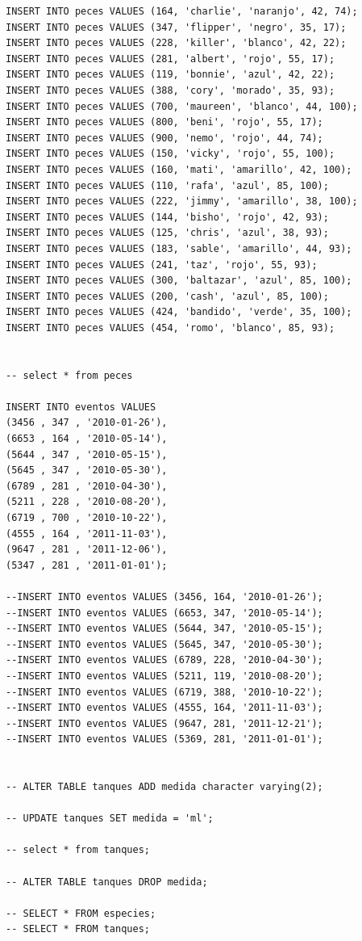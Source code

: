 \begin{lstlisting}[label=codigo1, caption=Ejemplo de SQL]
INSERT INTO peces VALUES (164, 'charlie', 'naranjo', 42, 74);
INSERT INTO peces VALUES (347, 'flipper', 'negro', 35, 17);
INSERT INTO peces VALUES (228, 'killer', 'blanco', 42, 22);
INSERT INTO peces VALUES (281, 'albert', 'rojo', 55, 17);
INSERT INTO peces VALUES (119, 'bonnie', 'azul', 42, 22);
INSERT INTO peces VALUES (388, 'cory', 'morado', 35, 93);
INSERT INTO peces VALUES (700, 'maureen', 'blanco', 44, 100);
INSERT INTO peces VALUES (800, 'beni', 'rojo', 55, 17);
INSERT INTO peces VALUES (900, 'nemo', 'rojo', 44, 74);
INSERT INTO peces VALUES (150, 'vicky', 'rojo', 55, 100);
INSERT INTO peces VALUES (160, 'mati', 'amarillo', 42, 100);
INSERT INTO peces VALUES (110, 'rafa', 'azul', 85, 100);
INSERT INTO peces VALUES (222, 'jimmy', 'amarillo', 38, 100);
INSERT INTO peces VALUES (144, 'bisho', 'rojo', 42, 93);
INSERT INTO peces VALUES (125, 'chris', 'azul', 38, 93);
INSERT INTO peces VALUES (183, 'sable', 'amarillo', 44, 93);
INSERT INTO peces VALUES (241, 'taz', 'rojo', 55, 93);
INSERT INTO peces VALUES (300, 'baltazar', 'azul', 85, 100);
INSERT INTO peces VALUES (200, 'cash', 'azul', 85, 100);
INSERT INTO peces VALUES (424, 'bandido', 'verde', 35, 100);
INSERT INTO peces VALUES (454, 'romo', 'blanco', 85, 93);


-- select * from peces

INSERT INTO eventos VALUES
(3456 , 347 , '2010-01-26'),
(6653 , 164 , '2010-05-14'),
(5644 , 347 , '2010-05-15'),
(5645 , 347 , '2010-05-30'),
(6789 , 281 , '2010-04-30'),
(5211 , 228 , '2010-08-20'),
(6719 , 700 , '2010-10-22'),
(4555 , 164 , '2011-11-03'),
(9647 , 281 , '2011-12-06'),
(5347 , 281 , '2011-01-01');

--INSERT INTO eventos VALUES (3456, 164, '2010-01-26');
--INSERT INTO eventos VALUES (6653, 347, '2010-05-14');
--INSERT INTO eventos VALUES (5644, 347, '2010-05-15');
--INSERT INTO eventos VALUES (5645, 347, '2010-05-30');
--INSERT INTO eventos VALUES (6789, 228, '2010-04-30');
--INSERT INTO eventos VALUES (5211, 119, '2010-08-20');
--INSERT INTO eventos VALUES (6719, 388, '2010-10-22');
--INSERT INTO eventos VALUES (4555, 164, '2011-11-03');
--INSERT INTO eventos VALUES (9647, 281, '2011-12-21');
--INSERT INTO eventos VALUES (5369, 281, '2011-01-01');


-- ALTER TABLE tanques ADD medida character varying(2);

-- UPDATE tanques SET medida = 'ml';

-- select * from tanques;

-- ALTER TABLE tanques DROP medida;

-- SELECT * FROM especies;
-- SELECT * FROM tanques;
\end{lstlisting}\vspace{-0.3cm}




